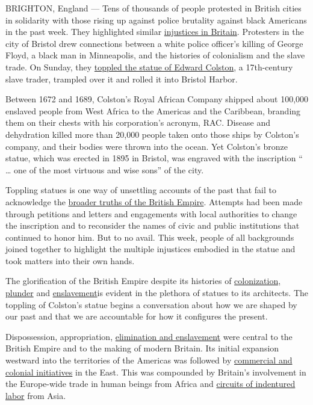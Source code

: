 BRIGHTON, England --- Tens of thousands of people protested in British
cities in solidarity with those rising up against police brutality
against black Americans in the past week. They highlighted similar
\href{https://www.theguardian.com/commentisfree/2020/jun/09/protests-british-history}{injustices
in Britain}. Protesters in the city of Bristol drew connections between
a white police officer's killing of George Floyd, a black man in
Minneapolis, and the histories of colonialism and the slave trade. On
Sunday, they
\href{https://www.theguardian.com/uk-news/2020/jun/07/blm-protesters-topple-statue-of-bristol-slave-trader-edward-colston}{toppled
the statue of Edward Colston}, a 17th-century slave trader, trampled
over it and rolled it into Bristol Harbor.

Between 1672 and 1689, Colston's Royal African Company shipped about
100,000 enslaved people from West Africa to the Americas and the
Caribbean, branding them on their chests with his corporation's acronym,
RAC. Disease and dehydration killed more than 20,000 people taken onto
those ships by Colston's company, and their bodies were thrown into the
ocean. Yet Colston's bronze statue, which was erected in 1895 in
Bristol, was engraved with the inscription `` \ldots{} one of the most
virtuous and wise sons'' of the city.

Toppling statues is one way of unsettling accounts of the past that fail
to acknowledge the
\href{https://www.theguardian.com/news/2017/nov/10/how-colonial-violence-came-home-the-ugly-truth-of-the-first-world-war}{broader
truths of the British Empire}. Attempts had been made through petitions
and letters and engagements with local authorities to change the
inscription and to reconsider the names of civic and public institutions
that continued to honor him. But to no avail. This week, people of all
backgrounds joined together to highlight the multiple injustices
embodied in the statue and took matters into their own hands.

The glorification of the British Empire despite its histories of
\href{https://lareviewofbooks.org/article/blighted-by-empire-what-the-british-did-to-india/}{colonization,
plunder} and
\href{http://www.nationalarchives.gov.uk/slavery/pdf/britain-and-the-trade.pdf}{enslavement}is
evident in the plethora of statues to its architects. The toppling of
Colston's statue begins a conversation about how we are shaped by our
past and that we are accountable for how it configures the present.

Dispossession, appropriation,
\href{https://www.youtube.com/watch?v=3NXC4Q_4JVg}{elimination and
enslavement} were central to the British Empire and to the making of
modern Britain. Its initial expansion westward into the territories of
the Americas was followed by
\href{https://www.nytimes.com/2019/09/04/opinion/east-india-company.html}{commercial
and colonial initiatives} in the East. This was compounded by Britain's
involvement in the Europe-wide trade in human beings from Africa and
\href{https://www.striking-women.org/module/map-major-south-asian-migration-flows/indentured-labour-south-asia-1834-1917}{circuits
of indentured labor} from Asia.

